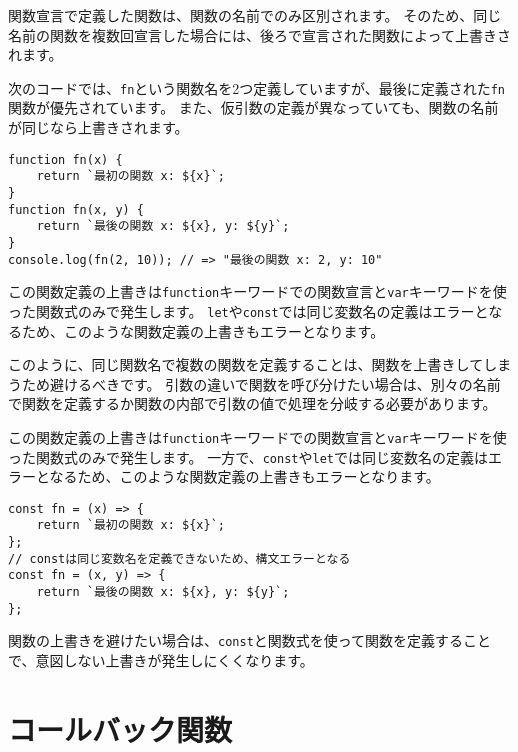 \begin{tcolorbox}[enhanced jigsaw,breakable,title=同じ名前の関数宣言は上書きされる]\label{function-overwrite}

関数宣言で定義した関数は、関数の名前でのみ区別されます。
そのため、同じ名前の関数を複数回宣言した場合には、後ろで宣言された関数によって上書きされます。

次のコードでは、\texttt{fn}という関数名を2つ定義していますが、最後に定義された\texttt{fn}関数が優先されています。
また、仮引数の定義が異なっていても、関数の名前が同じなら上書きされます。

\begin{lstlisting}
function fn(x) {
    return `最初の関数 x: ${x}`;
}
function fn(x, y) {
    return `最後の関数 x: ${x}, y: ${y}`;
}
console.log(fn(2, 10)); // => "最後の関数 x: 2, y: 10"
\end{lstlisting}

この関数定義の上書きは\texttt{function}キーワードでの関数宣言と\texttt{var}キーワードを使った関数式のみで発生します。
\texttt{let}や\texttt{const}では同じ変数名の定義はエラーとなるため、このような関数定義の上書きもエラーとなります。

このように、同じ関数名で複数の関数を定義することは、関数を上書きしてしまうため避けるべきです。
引数の違いで関数を呼び分けたい場合は、別々の名前で関数を定義するか関数の内部で引数の値で処理を分岐する必要があります。

この関数定義の上書きは\texttt{function}キーワードでの関数宣言と\texttt{var}キーワードを使った関数式のみで発生します。
一方で、\texttt{const}や\texttt{let}では同じ変数名の定義はエラーとなるため、このような関数定義の上書きもエラーとなります。

\begin{lstlisting}
const fn = (x) => {
    return `最初の関数 x: ${x}`;
};
// constは同じ変数名を定義できないため、構文エラーとなる
const fn = (x, y) => {
    return `最後の関数 x: ${x}, y: ${y}`;
};
\end{lstlisting}

関数の上書きを避けたい場合は、\texttt{const}と関数式を使って関数を定義することで、意図しない上書きが発生しにくくなります。
\end{tcolorbox}

\hypertarget{callback}{%
\section{コールバック関数}\label{callback}}

